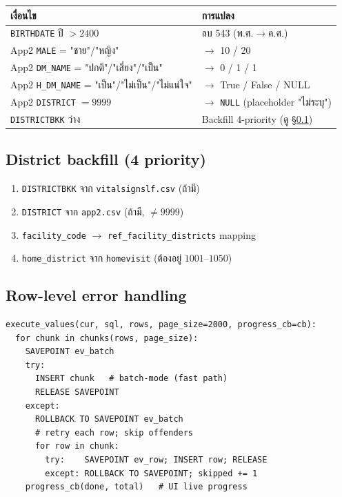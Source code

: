 \documentclass[11pt,a4paper]{article}
\begin{document}
\begin{center}
\footnotesize
\begin{tabularx}{\linewidth}{L{6cm} X}
\toprule
\textbf{เงื่อนไข} & \textbf{การแปลง} \\
\midrule
\texttt{BIRTHDATE} ปี $> 2400$     & ลบ 543 (พ.ศ.$\rightarrow$ค.ศ.) \\
App2 \texttt{MALE} = "ชาย"/"หญิง"   & $\rightarrow$ 10 / 20 \\
App2 \texttt{DM\_NAME} = "ปกติ"/"เสี่ยง"/"เป็น" & $\rightarrow$ 0 / 1 / 1 \\
App2 \texttt{H\_DM\_NAME} = "เป็น"/"ไม่เป็น"/"ไม่แน่ใจ" & $\rightarrow$ True / False / NULL \\
App2 \texttt{DISTRICT} $= 9999$    & $\rightarrow$ \texttt{NULL} (placeholder "ไม่ระบุ") \\
\texttt{DISTRICTBKK} ว่าง          & Backfill 4-priority (ดู \S\ref{sec:backfill}) \\
\bottomrule
\end{tabularx}
\end{center}

\subsection{District backfill (4 priority)}
\label{sec:backfill}

\begin{enumerate}[leftmargin=*, itemsep=1pt]
  \item \texttt{DISTRICTBKK} จาก \texttt{vitalsignslf.csv} (ถ้ามี)
  \item \texttt{DISTRICT} จาก \texttt{app2.csv} (ถ้ามี, $\ne 9999$)
  \item \texttt{facility\_code} $\rightarrow$ \texttt{ref\_facility\_districts} mapping
  \item \texttt{home\_district} จาก \texttt{homevisit} (ต้องอยู่ $1001$--$1050$)
\end{enumerate}

\subsection{Row-level error handling}

\begin{lstlisting}[style=pythonstyle]
execute_values(cur, sql, rows, page_size=2000, progress_cb=cb):
  for chunk in chunks(rows, page_size):
    SAVEPOINT ev_batch
    try:
      INSERT chunk   # batch-mode (fast path)
      RELEASE SAVEPOINT
    except:
      ROLLBACK TO SAVEPOINT ev_batch
      # retry each row; skip offenders
      for row in chunk:
        try:    SAVEPOINT ev_row; INSERT row; RELEASE
        except: ROLLBACK TO SAVEPOINT; skipped += 1
    progress_cb(done, total)   # UI live progress
\end{lstlisting}
\end{document}
